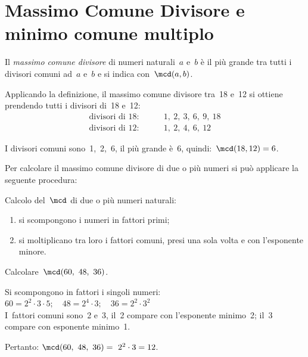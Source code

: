 
\section{Massimo Comune Divisore e minimo comune multiplo}
\label{sec:nat_mcdemcm}

\label{def:mcd}
\begin{definizione}{}{}
Il \emph{massimo comune divisore} di numeri naturali~\(a\) e~\(b\)  è il
più grande tra tutti i divisori comuni ad~\(a\) e~\(b\)
e si indica con~\(\mcd(a,b)\).
\end{definizione}

Applicando la definizione, il massimo comune divisore tra~18 e~12 si 
ottiene prendendo tutti i divisori di~18 e~12:
\begin{align*}
\text{divisori di }18: & \qquad 1,~2,~3,~6,~9,~18\\
\text{divisori di }12: & \qquad 1,~2,~4,~6,~12
\end{align*}

I divisori comuni sono~1,~2,~6, il più grande è~6, quindi:~\(\mcd(18, 
12)=6\). 


Per calcolare il massimo comune divisore di due o più numeri si può 
applicare la seguente procedura:

\begin{procedura}{}{}
Calcolo del~\(\mcd\) di due o più numeri naturali:
\begin{enumerate}[noitemsep, label=(\alph*)]
 \item si scompongono i numeri in fattori primi;
 \item si moltiplicano tra loro i fattori comuni, 
  presi una sola volta e con l'esponente minore.
\end{enumerate}
\end{procedura}


\begin{esempio}{}{}
Calcolare~\(\mcd(60,~48,~36)\).

Si scompongono in fattori i singoli numeri:\\
\(60 = 2^2\cdot3\cdot5; \quad 48 = 2^4\cdot3; \quad 36 = 2^2\cdot3^2\)\\
I~fattori comuni sono~2 e~3, il~2 compare con l'esponente minimo~2; 
il~3 compare con esponente minimo~1.

Pertanto: \quad \(\mcd(60,~48,~36)=~2^2 \cdot 3 = 12\).
\end{esempio}

